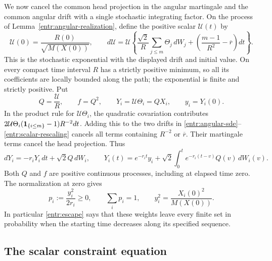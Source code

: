 We now cancel the common head projection in the angular martingale and
the common angular drift with a single stochastic integrating factor.
On the process of Lemma~\ref{entr:angular-realization}, define the
positive scalar \(\mathcal U(t)\) by
\begin{equation}\label{entr:scalar-rescaling}
 \mathcal U(0)=\frac{R(0)}{\sqrt{M(X(0))}},\qquad
 d\mathcal U
 =\mathcal U\left\{
     \frac{\sqrt2}{R}\sum_{j\le m}\Theta_j\,dW_j
       +\left(\frac{m-1}{R^2}-\overline r\right)dt\right\}.
\end{equation}
This is the stochastic exponential with the displayed drift and initial
value.  On every compact time interval \(R\) has a strictly positive
minimum, so all its coefficients are locally bounded along the path;
the exponential is finite and strictly positive.  Put
\begin{equation}\label{entr:YQ}
 Q=\frac{\mathcal U}{R},\qquad f=Q^2,\qquad
 Y_i=\mathcal U\Theta_i=QX_i,\qquad y_i=Y_i(0).
\end{equation}
In the product rule for \(\mathcal U\Theta_i\), the quadratic
covariation contributes
\(2\mathcal U\Theta_i(\mathbf 1_{\{i\le m\}}-1)R^{-2}dt\).
Adding this to the two drifts in
\eqref{entr:angular-sde}--\eqref{entr:scalar-rescaling} cancels all
terms containing \(R^{-2}\) or \(\overline r\).  Their martingale
terms cancel the head projection.  Thus
\begin{equation}\label{entr:common-sde}
 dY_i=-r_iY_i\,dt+\sqrt2Q\,dW_i,\qquad
 Y_i(t)=e^{-r_it}y_i+\sqrt2\int_0^t e^{-r_i(t-v)}Q(v)\,dW_i(v).
\end{equation}
Both \(Q\) and \(f\) are positive continuous processes, including at
elapsed time zero.  The normalization at zero gives
\begin{equation}\label{entr:seed-weights}
 p_i:=\frac{y_i^2}{2r_i}\ge0,\qquad
 \sum_i p_i=1,\qquad
 y_i^2=\frac{X_i(0)^2}{M(X(0))}.
\end{equation}
In particular \eqref{entr:escape} says that these weights leave every
finite set in probability when the starting time decreases along its
specified sequence.

\subsection{The scalar constraint equation}

